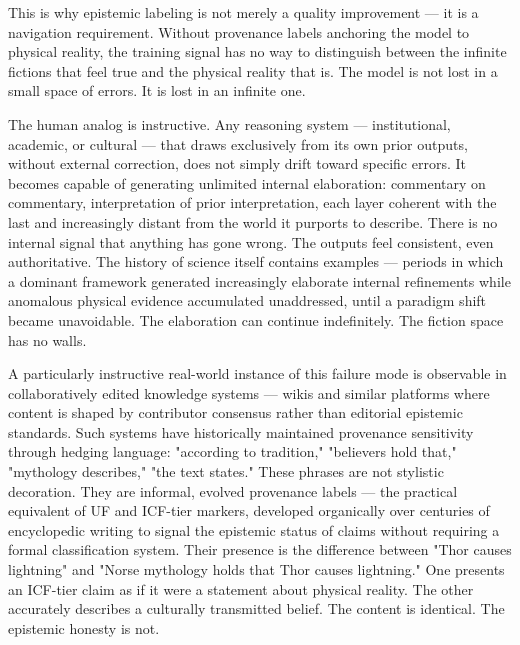 \documentclass[
]{article}
\begin{document}
This is why epistemic labeling is not merely a quality improvement ---
it is a navigation requirement. Without provenance labels anchoring the
model to physical reality, the training signal has no way to distinguish
between the infinite fictions that feel true and the physical reality
that is. The model is not lost in a small space of errors. It is lost in
an infinite one.

The human analog is instructive. Any reasoning system --- institutional,
academic, or cultural --- that draws exclusively from its own prior
outputs, without external correction, does not simply drift toward
specific errors. It becomes capable of generating unlimited internal
elaboration: commentary on commentary, interpretation of prior
interpretation, each layer coherent with the last and increasingly
distant from the world it purports to describe. There is no internal
signal that anything has gone wrong. The outputs feel consistent, even
authoritative. The history of science itself contains examples ---
periods in which a dominant framework generated increasingly elaborate
internal refinements while anomalous physical evidence accumulated
unaddressed, until a paradigm shift became unavoidable. The elaboration
can continue indefinitely. The fiction space has no walls.

A particularly instructive real-world instance of this failure mode is
observable in collaboratively edited knowledge systems --- wikis and
similar platforms where content is shaped by contributor consensus
rather than editorial epistemic standards. Such systems have
historically maintained provenance sensitivity through hedging language:
"according to tradition," "believers hold that," "mythology describes,"
"the text states." These phrases are not stylistic decoration. They are
informal, evolved provenance labels --- the practical equivalent of UF
and ICF-tier markers, developed organically over centuries of
encyclopedic writing to signal the epistemic status of claims without
requiring a formal classification system. Their presence is the
difference between "Thor causes lightning" and "Norse mythology holds
that Thor causes lightning." One presents an ICF-tier claim as if it
were a statement about physical reality. The other accurately describes
a culturally transmitted belief. The content is identical. The epistemic
honesty is not.
\end{document}
